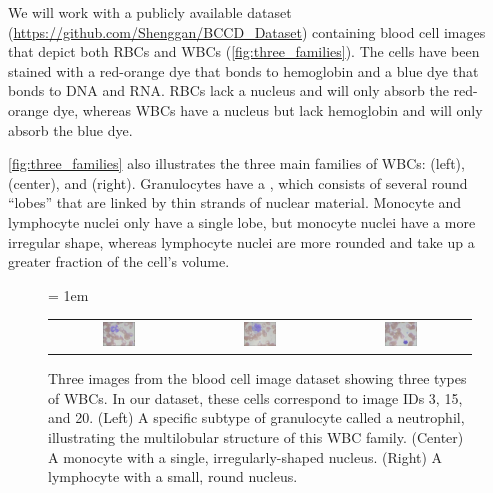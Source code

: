 We will work with a publicly available dataset (\url{https://github.com/Shenggan/BCCD_Dataset}) containing blood cell images that depict both RBCs and WBCs (\autoref{fig:three_families}). The cells have been stained with a red-orange dye that bonds to hemoglobin and a blue dye that bonds to DNA and RNA. RBCs lack a nucleus and will only absorb the red-orange dye, whereas WBCs have a nucleus but lack hemoglobin and will only absorb the blue dye.

\autoref{fig:three_families} also illustrates the three main families of WBCs:  (left),  (center), and  (right).  Granulocytes have a , which consists of several round ``lobes'' that are linked by thin strands of nuclear material. Monocyte and lymphocyte nuclei only have a single lobe, but monocyte nuclei have a more irregular shape, whereas lymphocyte nuclei are more rounded and take up a greater fraction of the cell's volume.\\

\begin{figure}[h]
\centering
\tabcolsep = 1em
\mySfFamily
\begin{tabular}{c c c}
\includegraphics[width = 0.25\textwidth]{../images/neutrophil.png} & \includegraphics[width = 0.25\textwidth]{../images/monocyte.png} & \includegraphics[width = 0.25\textwidth]{../images/lymphocyte.png}
\end{tabular}
\caption{Three images from the blood cell image dataset showing three types of WBCs. In our dataset, these cells correspond to image IDs 3, 15, and 20. (Left) A specific subtype of granulocyte called a neutrophil, illustrating the multilobular structure of this WBC family. (Center) A monocyte with a single, irregularly-shaped nucleus. (Right) A lymphocyte with a small, round nucleus.}
\label{fig:three_families}
\end{figure}

